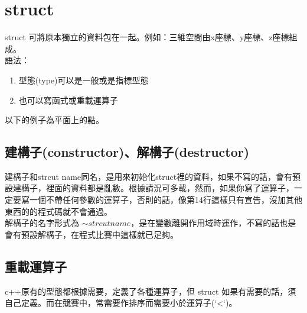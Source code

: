 \section{struct}
struct 可將原本獨立的資料包在一起。例如：三維空間由x座標、y座標、z座標組成。\\
語法：
\begin{enumerate}
\item 型態(type)可以是一般或是指標型態
\item 也可以寫函式或重載運算子
\end{enumerate}

以下的例子為平面上的點。

\subsection{建構子(constructor)、解構子(destructor)}
建構子和strcut name同名，是用來初始化struct裡的資料，如果不寫的話，會有預設建構子，裡面的資料都是亂數。根據請況可多載，然而，如果你寫了運算子，一定要寫一個不帶任何參數的運算子，否則的話，像第14行這樣只有宣告，沒加其他東西的的程式碼就不會通過。\\
解構子的名字形式為 $ \sim strcut name$，是在變數離開作用域時運作，不寫的話也是會有預設解構子，在程式比賽中這樣就已足夠。
\subsection{重載運算子}
c++原有的型態都根據需要，定義了各種運算子，但 struct 如果有需要的話，須自己定義。而在競賽中，常需要作排序而需要小於運算子(`<`)。